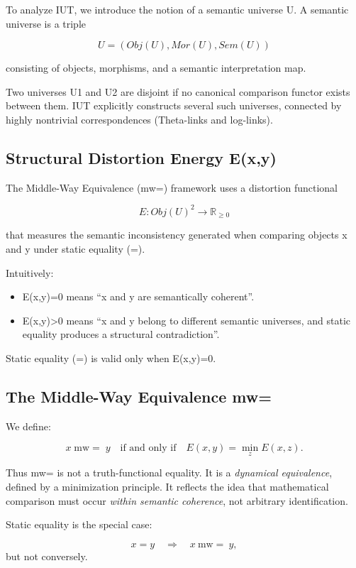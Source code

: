 \documentclass[11pt]{article}
\begin{document}
To analyze IUT, we introduce the notion of a semantic universe U.
A semantic universe is a triple

\[
U = (Obj(U), Mor(U), Sem(U))
\]

consisting of objects, morphisms, and a semantic interpretation map.

Two universes U1 and U2 are disjoint if no canonical comparison functor
exists between them. IUT explicitly constructs several such universes,
connected by highly nontrivial correspondences (Theta-links and log-links).

\subsection{Structural Distortion Energy E(x,y)}

The Middle-Way Equivalence (mw=) framework uses a distortion functional

\[
E: Obj(U)^2 \to \mathbb{R}_{\ge 0}
\]

that measures the semantic inconsistency generated when comparing
objects x and y under static equality (=).

Intuitively:

\begin{itemize}
\item E(x,y)=0 means ``x and y are semantically coherent''.
\item E(x,y)>0 means ``x and y belong to different semantic universes,
and static equality produces a structural contradiction''.
\end{itemize}

Static equality (=) is valid only when E(x,y)=0.

\subsection{The Middle-Way Equivalence mw=}

We define:

\[
x \; \mathrm{mw=} \; y
\quad\text{if and only if}\quad
E(x,y) = \min_{z} E(x,z).
\]

Thus mw= is not a truth-functional equality. It is a
\emph{dynamical equivalence}, defined by a minimization principle.
It reflects the idea that mathematical comparison must occur
\emph{within semantic coherence}, not arbitrary identification.

Static equality is the special case:

\[
x=y \quad \Rightarrow \quad x \ \mathrm{mw=} \ y,
\]
but not conversely.
\end{document}
